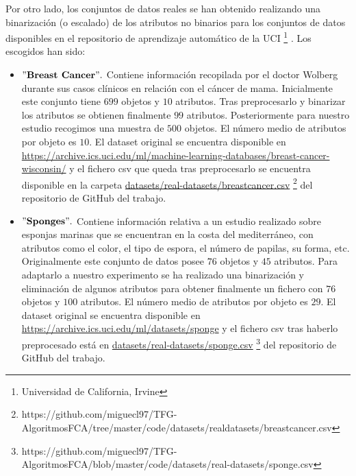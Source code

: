 \documentclass[oneside,openright,titlepage,numbers=noenddot,openany,headinclude,footinclude=true,
cleardoublepage=empty,abstractoff,BCOR=5mm,paper=a4,fontsize=12pt,main=spanish]{scrreprt}
\begin{document}
Por otro lado, los conjuntos de datos reales se han obtenido realizando una binarización \cite{binarization} (o escalado) de los atributos no binarios para los conjuntos de datos disponibles en el repositorio de aprendizaje automático de la UCI \footnote{Universidad de California, Irvine} \cite{uci}. Los escogidos  han sido:

\begin{itemize}
    \item $"\textbf{Breast Cancer}".$ Contiene información recopilada por el doctor Wolberg \cite{breast} durante sus casos clínicos en relación con el cáncer de mama. Inicialmente este conjunto tiene $699$ objetos y $10$ atributos. Tras preprocesarlo y binarizar los atributos se obtienen finalmente $99$ atributos. Posteriormente para nuestro estudio recogimos una muestra de $500$ objetos. El número medio de atributos por objeto es $10$. El dataset original se encuentra disponible en \href{https://archive.ics.uci.edu/ml/machine-learning-databases/breast-cancer-wisconsin/}{https://archive.ics.uci.edu/\linebreak ml/machine-learning-databases/breast-cancer-wisconsin/} y el fichero csv que queda tras preprocesarlo se encuentra disponible en la carpeta \href{https://github.com/miguecl97/TFG-AlgoritmosFCA/tree/master/code/datasets/real-datasets/breastcancer.csv}{datasets/real-datasets/breastcancer.csv} \footnote{https://github.com/miguecl97/TFG-AlgoritmosFCA/tree/master/code/datasets/real\-datasets/breastcancer.csv} del repositorio de GitHub del trabajo.
    \item $"\textbf{Sponges}".$ Contiene información relativa a un estudio realizado sobre esponjas marinas que se encuentran en la costa del mediterráneo, con atributos como el color, el tipo de espora, el número de papilas, su forma, etc. Originalmente este conjunto de datos posee $76$ objetos y $45$ atributos. Para adaptarlo a nuestro experimento se ha realizado una binarización y eliminación de algunos atributos para obtener finalmente un fichero con $76$ objetos y $100$ atributos. El número medio de atributos por objeto es $29$. El dataset original se encuentra disponible en \href{https://archive.ics.uci.edu/ml/datasets/sponge}{https://archive.ics.uci.edu/ml/datasets/sponge} y el fichero csv tras haberlo preprocesado está en \href{https://github.com/miguecl97/TFG-AlgoritmosFCA/blob/master/code/datasets/real-datasets/sponge.csv}{datasets/real-datasets/sponge.csv} \footnote{https://github.com/miguecl97/TFG-AlgoritmosFCA/blob/master/code/datasets/real-datasets/sponge.csv} del repositorio de GitHub del trabajo.
\end{itemize}
\end{document}
